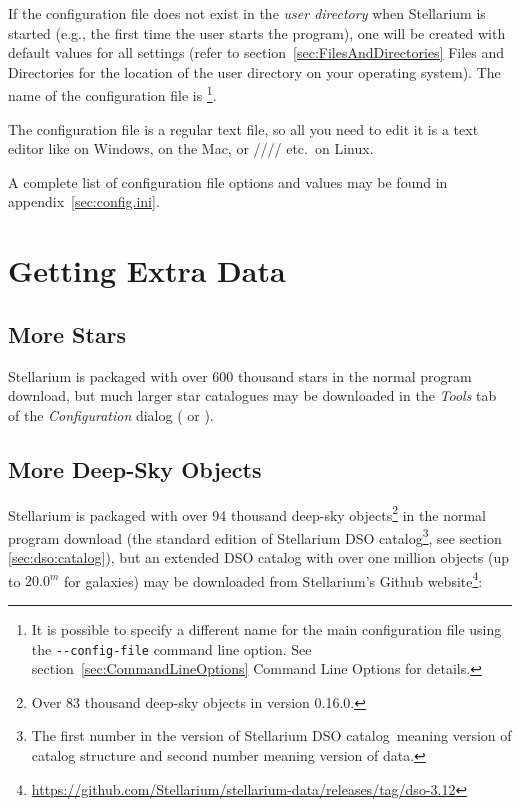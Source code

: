 If the configuration file does not exist in the \emph{user directory}
when Stellarium is started (e.g., the first time the user starts the
program), one will be created with default values for all settings
(refer to section~\ref{sec:FilesAndDirectories} Files and
Directories for the location of the user directory on your operating
system). The name of the configuration file is
\footnote{It is possible to specify a different name
  for the main configuration file using the \texttt{-\/-config-file}
  command line option. See section~\ref{sec:CommandLineOptions} Command 
  Line Options for details.}.

The configuration file is a regular text file, so all you need to edit
it is a text editor like  on Windows,  on
the Mac, or //// etc.\ on Linux.

A complete list of configuration file options and values may be found
in appendix~\ref{sec:config.ini}.


\section{Getting Extra Data}
\label{sec:ExtraData}

\subsection{More Stars}
\label{sec:ExtraData:stars}
Stellarium is packaged with over 600 thousand stars in the normal
program download, but much larger star catalogues may be downloaded
in the \emph{Tools} tab of the \emph{Configuration} dialog ( or
).

\subsection{More Deep-Sky Objects}
\label{sec:ExtraData:DSOs}

\noindent{}Stellarium is packaged with over 94 thousand deep-sky 
objects\footnote{Over 83 thousand deep-sky objects in version 0.16.0.} in the normal
program download (the standard edition of Stellarium DSO catalog\footnote{The first 
number in the version of Stellarium DSO catalog meaning version of catalog structure 
and second number meaning version of data.}, see section \ref{sec:dso:catalog}), 
but an extended DSO catalog with over one million objects (up to $20.0^m$ for galaxies) may be downloaded
from Stellarium's Github website\footnote{\url{https://github.com/Stellarium/stellarium-data/releases/tag/dso-3.12}}:

